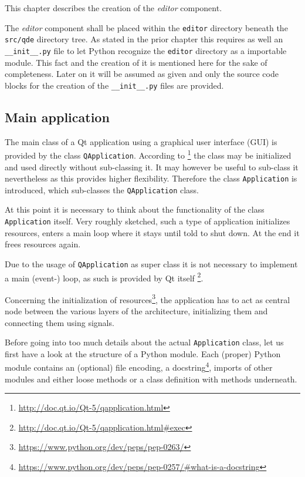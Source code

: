 \documentclass[10pt, openright, notitlepage]{scrreprt}
\begin{document}
This chapter describes the creation of the \emph{editor} component.

The \emph{editor} component shall be placed within the \texttt{editor} directory beneath the
\texttt{src/qde} directory tree. As stated in the prior chapter this requires as well
an \texttt{\_\_init\_\_.py} file to let Python recognize the \texttt{editor} directory as a
importable module. This fact and the creation of it is mentioned here for the
sake of completeness. Later on it will be assumed as given and only the source
code blocks for the creation of the \texttt{\_\_init\_\_.py} files are provided.

\subsection{Main application}
\label{sec:org61a1703}

The main class of a Qt application using a graphical user interface (GUI)
is provided by the class \texttt{QApplication}. According to
\footnote{\url{http://doc.qt.io/Qt-5/qapplication.html}} the class may be initialized and
used directly without sub-classing it. It may however be useful to sub-class it
nevertheless as this provides higher flexibility. Therefore the class
\texttt{Application} is introduced, which sub-classes the \texttt{QApplication} class.

At this point it is necessary to think about the functionality of the class
\texttt{Application} itself. Very roughly sketched, such a type of application
initializes resources, enters a main loop where it stays until told to shut
down. At the end it frees resources again.

Due to the usage of \texttt{QApplication} as super class it is not necessary to
implement a main (event-) loop, as such is provided by Qt itself
\footnote{\url{http://doc.qt.io/Qt-5/qapplication.html\#exec}}.

Concerning the initialization of
resources\footnote{\url{https://www.python.org/dev/peps/pep-0263/}}, the application has
to act as central node between the various layers of the architecture,
initializing them and connecting them using signals.\cite[S. 37 bis 38]{osterwalder_qde_2016}

Before going into too much details about the actual \texttt{Application} class, let us
first have a look at the structure of a Python module. Each (proper) Python
module contains an (optional) file encoding, a
docstring\footnote{\url{https://www.python.org/dev/peps/pep-0257/\#what-is-a-docstring}},
imports of other modules and either loose methods or a class definition with
methods underneath.
\end{document}
